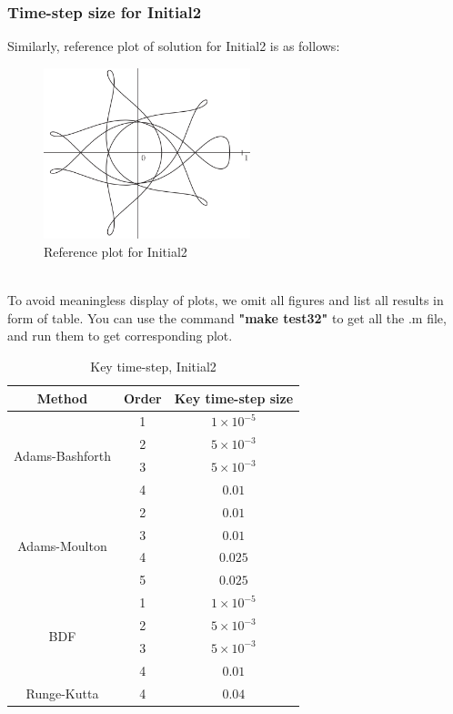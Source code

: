 \documentclass[a4paper,twocolumn]{article}
\theoremstyle{definition}
\begin{document}
\subsubsection{Time-step size for Initial2}
Similarly, reference plot of solution for Initial2 is as follows:
\begin{figure}[!htp]   
	\centering
	\includegraphics[width=6cm]{Pictures/I2.png}
	\caption{Reference plot for Initial2}
	\label{fig:R2}
\end{figure}\\
To avoid meaningless display of plots, we omit all figures and list all results in form of table. You can use the command \textbf{"make test32"} to get all the .m file, and run them to get corresponding plot.
\begin{table}[!htp]
	\centering
	\begin{tabular}{|c|c|c|}
		\hline
		Method & Order & Key time-step size \\
		\hline	
		\multirow{4}{*}{Adams-Bashforth} & 1 & $1\times 10^{-5}$  \\
		\cline{2-3}		
		 & 2 &$5\times 10^{-3}$\\	
		\cline{2-3}		
		 & 3 &$5\times 10^{-3}$  \\	
		\cline{2-3} 
		 & 4 &$0.01$  \\
		\hline
		\multirow{4}{*}{Adams-Moulton} & 2 & $0.01$  \\
		\cline{2-3}		
		& 3 &$0.01$\\	
		\cline{2-3}		
		& 4 &$0.025$  \\	
		\cline{2-3} 
		& 5 &$0.025$  \\
		\hline
		\multirow{4}{*}{BDF} & 1 & $1\times 10^{-5}$  \\
		\cline{2-3}		
		& 2 &$5\times 10^{-3}$\\	
		\cline{2-3}		
		& 3 &$5\times 10^{-3}$  \\	
		\cline{2-3} 
		& 4 &$0.01$  \\
		\hline
		Runge-Kutta & 4 & $0.04$ \\
		\hline
	\end{tabular}
	\caption{Key time-step, Initial2}
	\label{tab:test35}
\end{table}
\newpage
\end{document}
